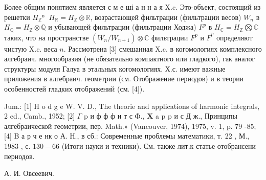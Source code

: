 \documentclass[10pt]{article}
\begin{document}
Более общим понятием является с м е ші а н н а я X.c. Это-объект, состоящий из решетки $H_{\mathbb{Z}}{ }^{\text {в }}$ $H_{\mathbb{R}}=H_{\mathbb{Z}} \otimes \mathbb{R}$, возрастающей фильтрации (фильтрации весов) $W_{n}$ в $H_{\mathbb{Q}}=H_{\mathbb{Z}} \otimes \mathbb{Q}$ и убывающей фильтрации (фильтрации Ходжа) $F^{p}$ в $H_{\mathbb{C}}=H_{\mathbb{Z}} \bigotimes \mathbb{C}$ таких, что на пространстве $\left(W_{n} / W_{n+1}\right) \otimes \mathbb{C}$ фильтрации $F^{p}$ и $\bar{F}^{p}$ определяют чистую X.c. веса $n$. Рассмотрена [3] смешанная X.c. в когомологиях комплексного алгебраич. многообразия (не обязательно компактного или гладкого), гак аналог структуры модуля Галуа в этальных когомологиях. Х.с. имеют важные приложения в алгебраич. геометрии (см. Отображение периодов) и в теории особенностей гладких отображений (см. [4]).



Jum.: [1] H o d g e W. V. D., The theorie and applications of harmonic integrals, 2 ed., Camb., 1952; [2] $\Gamma$ p и ф ф ф и т с Ф., $\mathbf{X}$ a p p и с Д ж., Принципы алгебраической геометрии, пер. Math.» (Vancouver, 1974), 1975, v. 1, p. 79 -85; [4] B а р ч е нк о А. Н., в сб.: Современные проблемы математики, т. 22 , М., 1983 , с. $130-66$ (Итоги науки и техники). См. также лит.к статье отобрансени периодов.



А. И. Овсеевич.
\end{document}
